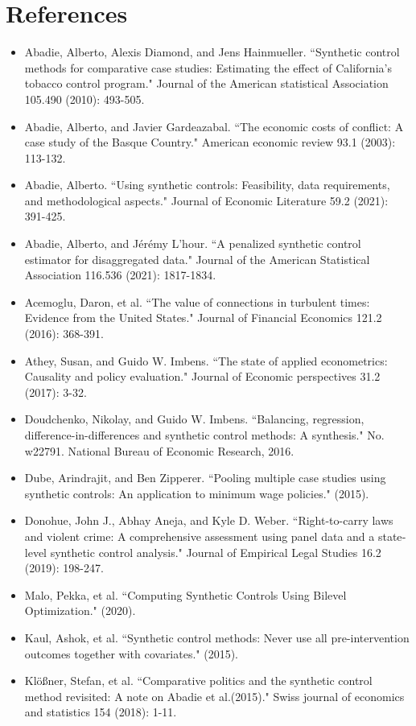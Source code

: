 \documentclass[12pt,a4paper,draft]{article}
\begin{document}
\section{References}
\begin{itemize}
    \item Abadie, Alberto, Alexis Diamond, and Jens Hainmueller. ``Synthetic control methods for comparative case studies: Estimating the effect of California's tobacco control program." Journal of the American statistical Association 105.490 (2010): 493-505.
    \item Abadie, Alberto, and Javier Gardeazabal. ``The economic costs of conflict: A case study of the Basque Country." American economic review 93.1 (2003): 113-132.
    \item Abadie, Alberto. ``Using synthetic controls: Feasibility, data requirements, and methodological aspects." Journal of Economic Literature 59.2 (2021): 391-425.
    \item Abadie, Alberto, and Jérémy L'hour. ``A penalized synthetic control estimator for disaggregated data." Journal of the American Statistical Association 116.536 (2021): 1817-1834.
    \item Acemoglu, Daron, et al. ``The value of connections in turbulent times: Evidence from the United States." Journal of Financial Economics 121.2 (2016): 368-391.
    \item Athey, Susan, and Guido W. Imbens. ``The state of applied econometrics: Causality and policy evaluation." Journal of Economic perspectives 31.2 (2017): 3-32.
    \item Doudchenko, Nikolay, and Guido W. Imbens. ``Balancing, regression, difference-in-differences and synthetic control methods: A synthesis." No. w22791. National Bureau of Economic Research, 2016.
    \item Dube, Arindrajit, and Ben Zipperer. ``Pooling multiple case studies using synthetic controls: An application to minimum wage policies." (2015).
    \item Donohue, John J., Abhay Aneja, and Kyle D. Weber. ``Right-to-carry laws and violent crime: A comprehensive assessment using panel data and a state‐level synthetic control analysis." Journal of Empirical Legal Studies 16.2 (2019): 198-247.
    \item Malo, Pekka, et al. ``Computing Synthetic Controls Using Bilevel Optimization." (2020).
    \item Kaul, Ashok, et al. ``Synthetic control methods: Never use all pre-intervention outcomes together with covariates." (2015).
    \item Klößner, Stefan, et al. ``Comparative politics and the synthetic control method revisited: A note on Abadie et al.(2015)." Swiss journal of economics and statistics 154 (2018): 1-11.
\end{itemize}
\end{document}
